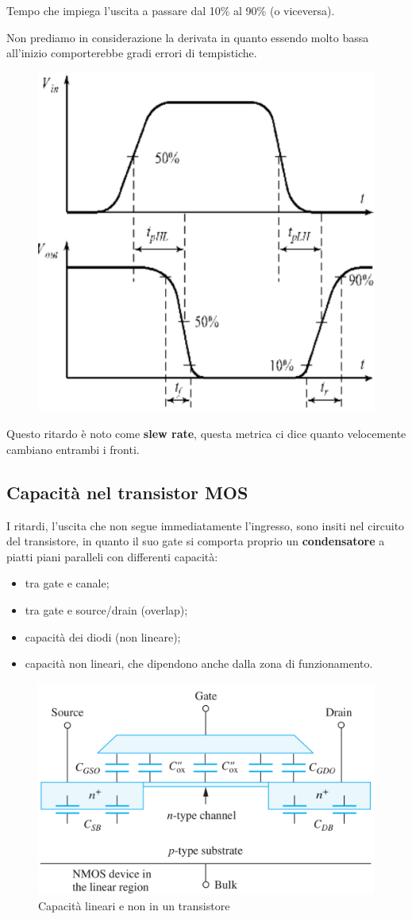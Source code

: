 Tempo	che	impiega	
l’uscita	a	passare	dal	10\%	
al	90\%	(o	viceversa).

Non prediamo in considerazione la derivata in quanto essendo molto bassa all'inizio comporterebbe gradi errori di tempistiche.


\begin{figure}[htbp]
    \centering
    \includegraphics[width=0.5\linewidth]{img/ritardi.png}        
\end{figure}

Questo ritardo è noto	come	\textbf{slew rate}, questa metrica ci dice quanto velocemente cambiano entrambi i fronti.

\newpage
\subsection{Capacità nel transistor MOS}

I ritardi, l'uscita che non segue immediatamente l'ingresso, sono insiti nel circuito del transistore, in quanto il suo gate si comporta proprio un \textbf{condensatore} a piatti piani paralleli con differenti capacità:

\begin{itemize}
    \item tra gate e canale;
    \item tra gate e source/drain (overlap);
    \item capacità dei diodi (non lineare);
    \item capacità non lineari, che dipendono anche dalla zona di funzionamento.
\end{itemize}


\begin{figure}[htbp]
    \centering
    \includegraphics[width=0.5\linewidth]{img/cond_a_piatti.png}
    \caption{Capacità lineari e non in un transistore}
    
\end{figure}

